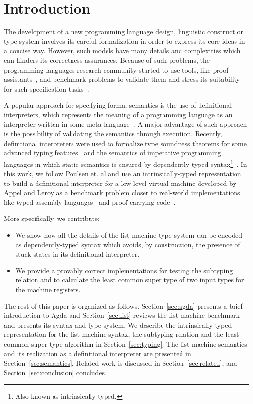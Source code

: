 \documentclass[sigconf]{acmart}
\theoremstyle{definition}
\begin{document}
\section{Introduction}

The development of a new programming language design, linguistic construct
or type system involves its careful formalization in order to express
its core ideas in a concise way. However, such models have many details
and complexities which can hinders its correctness assurances.
Because of such problems, the programming languages research community
started to use tools, like proof assistants~\cite{Stump16,Chlipala13},
and benchmark problems to validate them and stress its suitability for
such specification tasks~\cite{Aydemir05,Pientka18,Appel07}.

A popular approach for specifying formal semantics is the
use of definitional interpreters, which represents the meaning of a
programming language as an interpreter written in some
meta-language~\cite{Reynolds72}. A major advantage of such approach
is the possibility of validating the semantics through execution.
Recently, definitional interpreters were used to formalize type
soundness theorems for some advanced typing features~\cite{Amin17}
and the semantics of imperative programming languages in which static
semantics is ensured by dependently-typed
syntax\footnote{Also known as intrinsically-typed.}~\cite{Poulsen18}.
In this work, we follow Poulsen et. al and use an intrinsically-typed
representation to build a definitional interpreter for a low-level virtual
machine developed by Appel and Leroy as a benchmark problem closer to
real-world implementations like typed assembly languages~\cite{CraryM99} and
proof carrying code~\cite{Necula97}.

More specifically, we contribute:

\begin{itemize}
  \item We show how all the details of the list machine type system
        can be encoded as dependently-typed syntax which avoids, by construction,
        the presence of stuck states in its definitional interpreter.
  \item We provide a provably correct implementations for testing the subtyping
        relation and to calculate the least common super type of two input
        types for the machine registers.
\end{itemize}

The rest of this paper is organized as follows. Section~\ref{sec:agda}
presents a brief introduction to Agda and Section~\ref{sec:list}
reviews the list machine benchmark and presents its syntax and type system.
We describe the intrinsically-typed representation for the list machine syntax,
the subtyping relation and the least common super type algorithm in
Section~\ref{sec:typing}. The list machine semantics and its realization as
a definitional interpreter are presented in Section~\ref{sec:semantics}.
Related work is discussed in Section~\ref{sec:related},
and Section~\ref{sec:conclusion} concludes.
\end{document}

